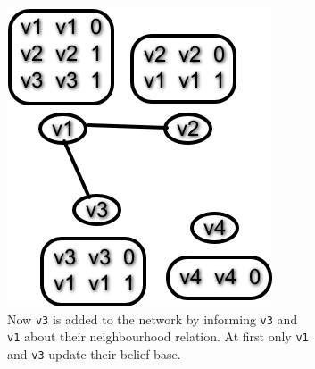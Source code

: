 \begin{figure}
    \begin{subfigure}{.45\textwidth}
       \includegraphics[width=\textwidth] {images/dv2.png}
       \caption{Now \texttt{v3} is added to the network by informing \texttt{v3} and \texttt{v1} about their neighbourhood relation.
                At first only \texttt{v1}  and \texttt{v3} update their belief base.}
    \end{subfigure}\quad
    \begin{subfigure}{.45\textwidth}

\end{subfigure}
\end{figure}
